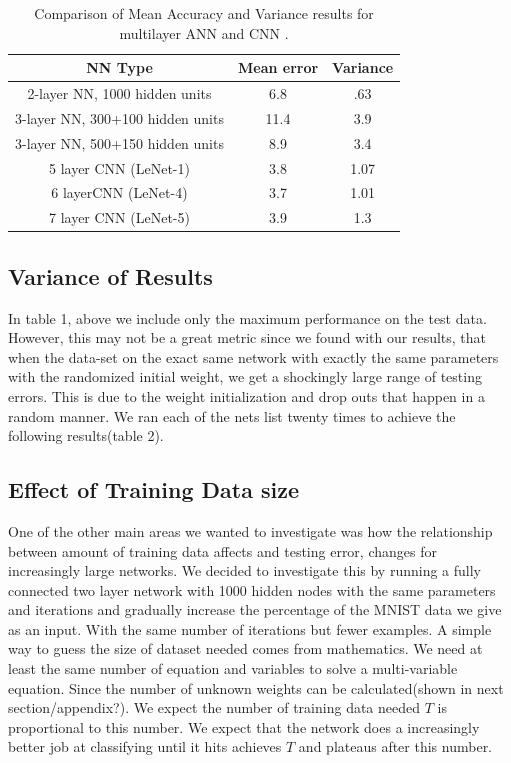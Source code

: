 \documentclass[12pt, twocolumn]{article}
\begin{document}
\begin{table}[t]
	\begin{center}
		\begin{tabular} { |c | c | c | }
			\hline
			NN Type & Mean error &   Variance\\ \hline
			2-layer NN, 1000 hidden units & 6.8  & .63\\ \hline
			3-layer NN, 300+100 hidden units & 11.4  & 3.9 \\ \hline
			3-layer NN, 500+150 hidden units & 8.9  & 3.4\\ \hline
			5 layer CNN  (LeNet-1) & 3.8  & 1.07 \\ \hline 
			6 layerCNN (LeNet-4) & 3.7 & 1.01\\ \hline 
			7 layer CNN (LeNet-5) &  3.9  &1.3\\ \hline
		\end{tabular}
		\label{table: MNISTLeCun}
		\caption{Comparison of Mean Accuracy and Variance results for multilayer ANN and CNN \cite{LeCun1998}.}
	\end{center}
\end{table}

\subsection{Variance of Results}
In table 1, above we include only the maximum performance on the test data. However, this may not be a great metric since we found with our results, that when the data-set on the exact same network with exactly the same parameters with the randomized initial weight, we get a shockingly large range of testing errors. This is due to the weight initialization and drop outs that happen in a random manner. We ran each of the nets list twenty times  to achieve the following results(table 2).





\subsection{Effect of Training Data size}
One of the other main areas we wanted to investigate was how the relationship between amount of training data affects and testing error, changes for increasingly large networks. We decided to investigate this by running a fully connected two layer network with 1000 hidden nodes with the same parameters and iterations and gradually increase the percentage of the MNIST data we give as an input. With the same number of iterations but fewer examples. A simple way to guess the size of dataset needed comes from mathematics.  We need at least the same number of equation and variables to solve a multi-variable equation. Since the number of unknown weights can be calculated(shown in next section/appendix?). We expect the number of training data needed $T$ is proportional to this number. We expect that the network does a increasingly better job at classifying until it hits achieves $T$ and plateaus after this number.
\end{document}
